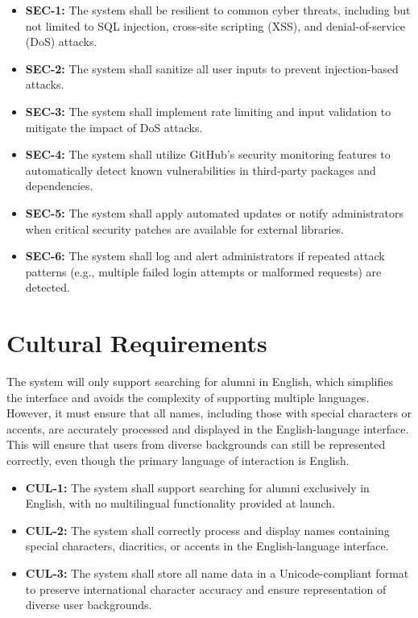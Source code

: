 \documentclass[12pt]{article}
\begin{document}
\begin{itemize}
    \item \textbf{SEC-1:} The system shall be resilient to common cyber threats, including but not limited to SQL injection, cross-site scripting (XSS), and denial-of-service (DoS) attacks.
    \item \textbf{SEC-2:} The system shall sanitize all user inputs to prevent injection-based attacks.
    \item \textbf{SEC-3:} The system shall implement rate limiting and input validation to mitigate the impact of DoS attacks.
    \item \textbf{SEC-4:} The system shall utilize GitHub's security monitoring features to automatically detect known vulnerabilities in third-party packages and dependencies.
    \item \textbf{SEC-5:} The system shall apply automated updates or notify administrators when critical security patches are available for external libraries.
    \item \textbf{SEC-6:} The system shall log and alert administrators if repeated attack patterns (e.g., multiple failed login attempts or malformed requests) are detected.
\end{itemize}

\section{Cultural Requirements}

The system will only support searching for alumni in English, which simplifies the interface and avoids the complexity of supporting multiple languages. However, it must ensure that all names, including those with special characters or accents, are accurately processed and displayed in the English-language interface. This will ensure that users from diverse backgrounds can still be represented correctly, even though the primary language of interaction is English.

\begin{itemize}
    \item \textbf{CUL-1:} The system shall support searching for alumni exclusively in English, with no multilingual functionality provided at launch.
    \item \textbf{CUL-2:} The system shall correctly process and display names containing special characters, diacritics, or accents in the English-language interface.
    \item \textbf{CUL-3:} The system shall store all name data in a Unicode-compliant format to preserve international character accuracy and ensure representation of diverse user backgrounds.
\end{itemize}
\end{document}
